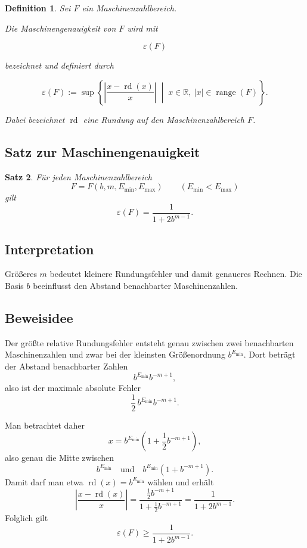 \documentclass{article}
\newcommand{\R}{\mathbb{R}}%
\newtheorem{thm}{Satz}
\newtheorem{defn}[thm]{Definition}
\begin{document}
\begin{defn}
Sei \(F\) ein Maschinenzahlbereich.

Die Maschinengenauigkeit von \(F\) wird mit

\[
\varepsilon(F)
\]

bezeichnet und definiert durch

\[
\varepsilon(F)
:=
\sup\left\{
\left|\frac{x-\operatorname{rd}(x)}{x}\right|
\;\middle|\;
x\in\R,\ |x|\in\operatorname{range}(F)
\right\}.
\]

Dabei bezeichnet \(\operatorname{rd}\) eine Rundung auf den Maschinenzahlbereich \(F\).
\end{defn}

\subsection*{Satz zur Maschinengenauigkeit}

\begin{thm}
Für jeden Maschinenzahlbereich
\[
F=F(b,m,E_{\min},E_{\max})
\qquad (E_{\min}<E_{\max})
\]
gilt
\[
\varepsilon(F)=\frac{1}{1+2b^{m-1}}.
\]
\end{thm}

\subsection*{Interpretation}

Größeres \(m\) bedeutet kleinere Rundungsfehler und damit genaueres Rechnen. Die Basis \(b\) beeinflusst den Abstand benachbarter Maschinenzahlen.

\subsection*{Beweisidee}

Der größte relative Rundungsfehler entsteht genau zwischen zwei benachbarten Maschinenzahlen und zwar bei der kleinsten Größenordnung \(b^{E_{\min}}\). Dort beträgt der Abstand benachbarter Zahlen
\[
b^{E_{\min}}b^{-m+1},
\]
also ist der maximale absolute Fehler
\[
\frac12\,b^{E_{\min}}b^{-m+1}.
\]

Man betrachtet daher
\[
x=b^{E_{\min}}\left(1+\frac12 b^{-m+1}\right),
\]
also genau die Mitte zwischen
\[
b^{E_{\min}}
\quad\text{und}\quad
b^{E_{\min}}\left(1+b^{-m+1}\right).
\]
Damit darf man etwa \(\operatorname{rd}(x)=b^{E_{\min}}\) wählen und erhält
\[
\left|\frac{x-\operatorname{rd}(x)}{x}\right|
=
\frac{\frac12 b^{-m+1}}
{1+\frac12 b^{-m+1}}
=
\frac{1}{1+2b^{m-1}}.
\]
Folglich gilt
\[
\varepsilon(F)\geq \frac{1}{1+2b^{m-1}}.
\]
\end{document}

